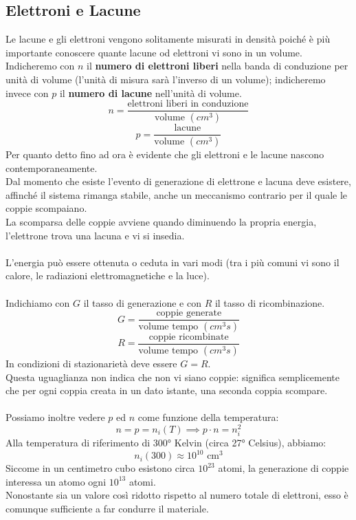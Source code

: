 \documentclass{article}
\numberwithin{equation}{subsection}
\begin{document}
	\subsection{Elettroni e Lacune}
	Le lacune e gli elettroni vengono solitamente misurati in densità poiché è più importante conoscere quante lacune od elettroni vi sono in un volume. \\
	Indicheremo con $n$ il \textbf{numero di elettroni liberi }nella banda di conduzione per unità di volume (l’unità di misura sarà l’inverso di un volume); indicheremo invece con $p$ il \textbf{numero di lacune} nell’unità di volume.
	$$n = \frac{\text{elettroni liberi in conduzione}}{\text{volume } (cm^3)}$$
	$$p = \frac{\text{lacune}}{\text{volume } (cm^3)}$$
	Per quanto detto fino ad ora è evidente che gli elettroni e le lacune nascono contemporaneamente. \\
	Dal momento che esiste l’evento di generazione di elettrone e lacuna deve esistere, affinché il sistema rimanga stabile, anche un meccanismo contrario per il quale le coppie scompaiano. \\
	La scomparsa delle coppie avviene quando diminuendo la propria energia, l’elettrone trova una lacuna e vi si insedia.\\\\
	L’energia può essere ottenuta o ceduta in vari modi (tra i più comuni vi sono il calore, le radiazioni elettromagnetiche e la luce).\\\\
	Indichiamo con $G$ il tasso di generazione e con $R$ il tasso di ricombinazione.
	$$G = \frac{\text{coppie generate}}{\text{volume tempo } (cm^3 s)}$$
	$$R = \frac{\text{coppie ricombinate}}{\text{volume tempo } (cm^3 s)}$$
	In condizioni di stazionarietà deve essere $G = R$. \\
	Questa uguaglianza non indica che non vi siano coppie: significa semplicemente che per ogni coppia creata in un dato istante, una seconda coppia scompare.\\\\
	Possiamo inoltre vedere $p$ ed $n$ come funzione della temperatura:
	$$n = p = n_i(T) \implies p \cdot n = n_i^2$$
	Alla temperatura di riferimento di 300° Kelvin (circa 27° Celsius), abbiamo:
	$$n_i(300) \approx 10^{10} \text{ cm}^3$$
	Siccome in un centimetro cubo esistono circa $10^{23}$ atomi, la generazione di coppie interessa un atomo ogni $10^{13}$ atomi. \\
	Nonostante sia un valore così ridotto rispetto al numero totale di elettroni, esso è comunque sufficiente a far condurre il materiale.
\end{document}
